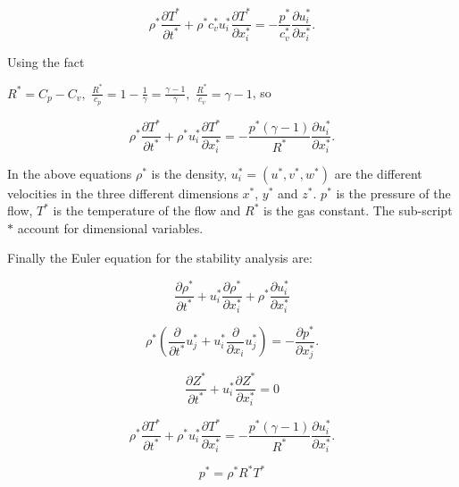 \begin{equation*}
\rho^*
\frac{\partial  T^*}{\partial  t^*}
+
\rho^*
c_v^*
u_i^*
\frac{\partial  T^*}{\partial x_i^*} 
= 
-
\frac{p^*}{c_v^*}
\frac{\partial u_i^* }{\partial x_i^*} 
.
\end{equation*} 

Using the fact 

$R^*=C_p-C_v, $
$\frac{R^*}{c_p}=1-\frac{1}{\gamma}=\frac{\gamma-1}{\gamma}, $
$\frac{R^*}{c_v}=\gamma-1$, so 


\begin{equation}
\rho^*
\frac{\partial  T^*}{\partial  t^*}
+
\rho^*
u_i^*
\frac{\partial  T^*}{\partial x_i^*} 
= 
-
\frac{p^*(\gamma-1)}{R^*}
\frac{\partial u_i^* }{\partial x_i^*} 
.
\end{equation} 

In the above equations $\rho^*$ is the density, $u_i^*=(u^*,v^*,w^*)$ 
are the different velocities in the three different dimensions $x^*$, $y^*$ and $z^*$.
$p^*$ is the pressure of the flow, $T^*$ is the temperature of the flow and
$R^{*}$ is the gas constant. 
The sub-script $*$ account for dimensional variables. 

Finally the Euler equation for the stability analysis are: 

\begin{equation} 
\frac{\partial\rho^*}{\partial t^*}
+
u_i^*
\frac{\partial \rho^*}{\partial x_i^*} 
+
\rho^*
\frac{\partial u_i^*}{\partial x_i^*}
\end{equation} 

\begin{equation} 
\rho^*
\left(
\frac{\partial}{\partial t^*}u_j^*
+
u_i^* 
\frac{\partial}{\partial x_i}u_j^*
\right)
=
-
\frac{\partial p^*}{\partial x_j^*} 
.
\end{equation} 

\begin{equation} 
\frac{\partial Z^*}{\partial t^*}
+
u_i ^*
\frac{\partial Z^*}{\partial x_i^*}
=
0
\end{equation} 

\begin{equation}
\rho^*
\frac{\partial  T^*}{\partial  t^*}
+
\rho^*
u_i^*
\frac{\partial  T^*}{\partial x_i^*} 
= 
-
\frac{p^*(\gamma-1)}{R^*}
\frac{\partial u_i^* }{\partial x_i^*} 
.
\end{equation} 

\begin{equation}
   p^*= \rho^*R^*T^*
\end{equation} 

